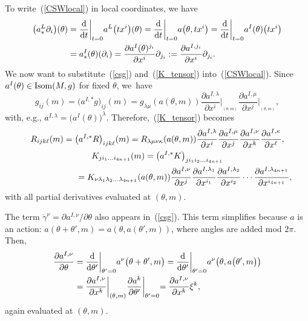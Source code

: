 \documentclass[10pt,a4paper]{amsart}
\numberwithin{equation}{section}
\theoremstyle{definition}
\newcommand{\isom}{{\rm Isom}}
\newcommand{\ism}{\isom}
\begin{document}
To write~(\ref{CSWlocal}) in local coordinates, we have
\begin{align}
\bigl(a^L_* \partial_i\bigr)(\theta) &=\frac{{\rm d}}{{\rm d}t}\biggl|_{t=0} a^L\bigl(tx^i\bigr)(\theta) =
\frac{{\rm d}}{{\rm d}t}\biggl|_{t=0} a\bigl(\theta, tx^i\bigr) =
\frac{{\rm d}}{{\rm d}t}\biggl|_{t=0} a^I(\theta)\bigl(tx^i\bigr)\nonumber\\
&= a^I_*(\theta)(\partial_i)
= \frac{\partial a^I(\theta)^{j_i}}{\partial x^i}\partial_{j_i}
:= \frac{\partial a^{I,j_i}}{\partial x^i}\partial_{j_i}.\label{eq:cyan1}
\end{align}
We now want to substitute~(\ref{csg}) and~(\ref{K_tensor}) into~(\ref{CSWlocal}). Since $a^I(\theta)\in \ism(M,g)$ for fixed $\theta$, we~have
\[ g_{ij}(m) = \bigl(a^{I,*}g\bigr)_{ij}(m) =g_{\lambda\mu}(a(\theta,m)) \frac{\partial a^{I, \lambda}}{\partial x^i}
\biggl|_{_{(\theta,m)}}
\frac{\partial a^{I, \mu}}{\partial x^j}\biggl|_{_{(\theta,m)}},\]
with, e.g., $a^{I,\lambda} = \bigl(a^I(\theta)\bigr)^\lambda$.
Therefore,~(\ref{K_tensor}) becomes
\begin{gather}
R_{ijk\ell}(m) = \bigl(a^{I,*}R\bigr)_{ijk\ell}(m) = R_{\lambda\mu\nu\kappa}(a(\theta,m))
\frac{\partial a^{I, \lambda}}{\partial x^i}\frac{\partial a^{I, \mu}}{\partial x^j}
\frac{\partial a^{I, \nu}}{\partial x^k}\frac{\partial a^{I, \kappa}}{\partial x^{\ell}},\nonumber\\
K_{ji_1\dots i_{4n+1}}(m)
=\bigl(a^{I,*}K\bigr)_{j i_1 i_2\dots i_{4n+1}} \nonumber\\
 \hphantom{K_{ji_1\dots i_{4n+1}}(m)}{}
 = K_{\nu \lambda_1\lambda_2\dots\lambda_{4n+1}}(a(\theta,m))
{\frac{\partial a^{I,\nu}}{\partial x^j}}
\frac{\partial a^{I, \lambda_1}}{\partial x^{i_1}}\frac{\partial a^{I, \lambda_2}}{\partial x^{i_2}} \cdots
\frac{\partial a^{I, \lambda_{4n+1}}}{\partial x^{i_{4n+1}}},\label{eq:11}
\end{gather}
with all partial derivatives evaluated at $(\theta,m)$.

The term $\dot\gamma^\nu = \partial a^{I,\nu}/\partial\theta$ also appears in~(\ref{csg}).
This term simplifies because $a$ is an action: $a(\theta + \theta',m) =a(\theta,a(\theta',m))$, where angles are added mod $2\pi$. Then,
\begin{align}
\frac{\partial a^{I,\nu}}{\partial\theta} &= \frac{{\rm d}}{{\rm d}\theta'}\biggl|_{\theta'=0}
a^\nu\bigl(\theta+\theta',m\bigr) = \frac{{\rm d}}{{\rm d}\theta'}\biggl|_{\theta'=0} a^\nu\bigl(\theta,a\bigl(\theta',m\bigr)\bigr)
\nonumber\\
&= \frac{\partial a^{I,\nu}}{\partial x^k}\biggl|_{(\theta,m)}\frac{\partial a^k}{\partial \theta'}\biggl|_{\theta'=0}
= \frac{\partial a^{I,\nu}}{\partial x^k}\xi^k,\label{eq:cyan2}
\end{align}
again evaluated at $(\theta,m)$.
\end{document}
